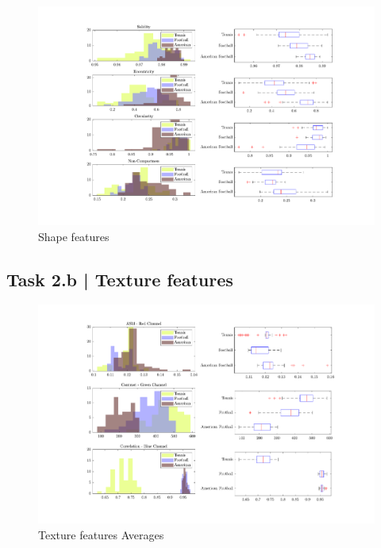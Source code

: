 \documentclass[conference]{IEEEtran}
\begin{document}
\begin{figure}[htbp]
    \centering
    \includegraphics[width=\columnwidth]{figures/shape_feats.pdf}
    \caption{Shape features\label{fig:shape_feats}}
\end{figure}


\subsection*{Task 2.b | Texture features}

\begin{figure}[htbp]
    \centering
    \includegraphics[width=\columnwidth]{figures/averages.pdf}
    \caption{Texture features Averages\label{fig:tex_feats_avgs}}
\end{figure}
\end{document}

